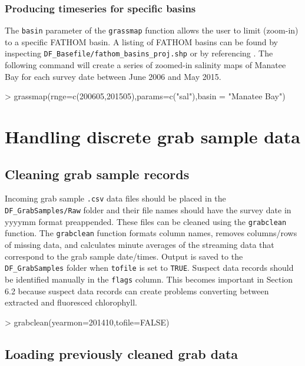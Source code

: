 \documentclass[12pt]{article}
\begin{document}
\subsubsection{Producing timeseries for specific basins}

The \texttt{basin} parameter of the \texttt{grassmap} function allows the user to limit (zoom-in) to a specific FATHOM basin. A listing of FATHOM basins can be found by inspecting \verb|DF_Basefile/fathom_basins_proj.shp| or by referencing \citet{cosby2005fathom}. The following command will create a series of zoomed-in salinity maps of Manatee Bay for each survey date between June 2006 and May 2015.   

\begin{Schunk}
\begin{Sinput}
> grassmap(rnge=c(200605,201505),params=c("sal"),basin = "Manatee Bay")
\end{Sinput}
\end{Schunk}


\section{Handling discrete grab sample data}
\subsection{Cleaning grab sample records}
Incoming grab sample \texttt{.csv} data files should be placed in the \verb|DF_GrabSamples/Raw| folder and their file names should have the survey date in yyyymm format preappended. These files can be cleaned using the \texttt{grabclean} function. The \texttt{grabclean} function formats column names, removes columns/rows of missing data, and calculates minute averages of the streaming data that correspond to the grab sample date/times. Output is saved to the \verb|DF_GrabSamples| folder when \texttt{tofile} is set to \texttt{TRUE}. Suspect data records should be identified manually in the \texttt{flags} column. This becomes important in Section 6.2 because suspect data records can create problems converting between extracted and fluoresced chlorophyll.

\begin{Schunk}
\begin{Sinput}
> grabclean(yearmon=201410,tofile=FALSE)
\end{Sinput}
\end{Schunk}

\subsection{Loading previously cleaned grab data}
\end{document}
